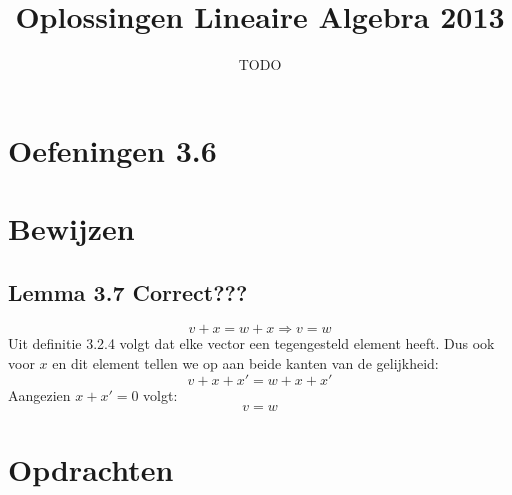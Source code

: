 \documentclass[10pt,a4paper]{article}
\title{Oplossingen Lineaire Algebra 2013}
\author{TODO}
\begin{document}
\maketitle
\pagebreak
\tableofcontents
\pagebreak
\section*{Oefeningen 3.6}

\section*{Bewijzen}
\subsection*{Lemma 3.7 Correct???}
$$v+x = w + x \Rightarrow v=w$$
Uit definitie 3.2.4 volgt dat elke vector een tegengesteld element heeft. Dus ook voor $x$ en dit element tellen we op aan beide kanten van de gelijkheid:
$$v+x+x' = w + x + x'$$
Aangezien $x + x' = 0$ volgt:
$$v = w$$
\section*{Opdrachten}
\end{document}

